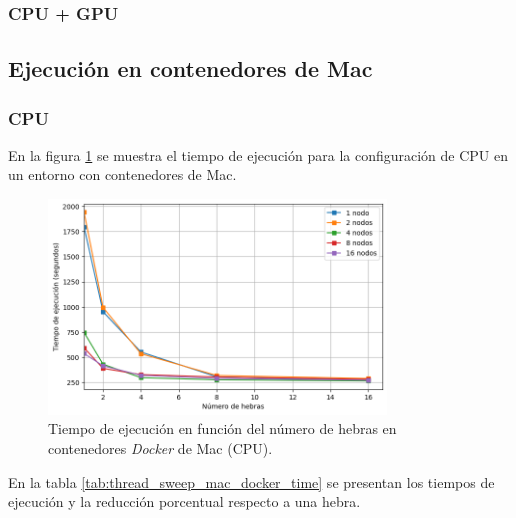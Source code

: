 \subsubsection{CPU + GPU}

\subsection{Ejecución en contenedores de Mac}
\subsubsection{CPU}

En la figura \ref{fig:thread_sweep_mac_docker_time} se muestra el tiempo de ejecución para la configuración de CPU en un entorno con contenedores de Mac.

\begin{figure}[H]
    \centering
    \includegraphics[width=0.8\textwidth]{imagenes/cap5/thread_sweep_mac_docker_time.png}
    \caption{Tiempo de ejecución en función del número de hebras en contenedores \textit{Docker} de Mac (CPU).}
    \label{fig:thread_sweep_mac_docker_time}
\end{figure}

En la tabla \ref{tab:thread_sweep_mac_docker_time} se presentan los tiempos de ejecución y la reducción porcentual respecto a una hebra.

